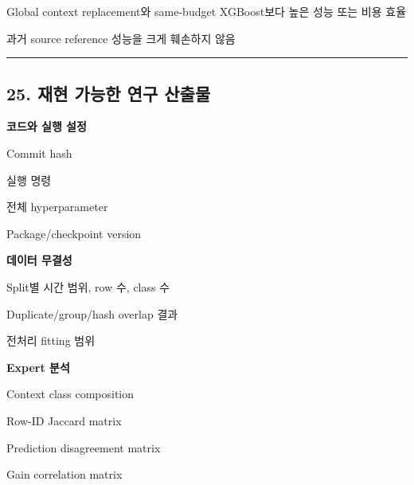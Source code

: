 \par\noindent \textbullet\enspace Global context replacement와 same-budget XGBoost보다 높은 성능 또는 비용 효율


\par\noindent \textbullet\enspace 과거 source reference 성능을 크게 훼손하지 않음



\medskip\hrule\medskip
\subsection{25. 재현 가능한 연구 산출물}
\par\noindent \textbullet\enspace \textbf{코드와 실행 설정}

\par\noindent \textbullet\enspace Commit hash


\par\noindent \textbullet\enspace 실행 명령


\par\noindent \textbullet\enspace 전체 hyperparameter


\par\noindent \textbullet\enspace Package/\allowbreak{}checkpoint version



\par\noindent \textbullet\enspace \textbf{데이터 무결성}

\par\noindent \textbullet\enspace Split별 시간 범위, row 수, class 수


\par\noindent \textbullet\enspace Duplicate/\allowbreak{}group/\allowbreak{}hash overlap 결과


\par\noindent \textbullet\enspace 전처리 fitting 범위



\par\noindent \textbullet\enspace \textbf{Expert 분석}

\par\noindent \textbullet\enspace Context class composition


\par\noindent \textbullet\enspace Row-ID Jaccard matrix


\par\noindent \textbullet\enspace Prediction disagreement matrix


\par\noindent \textbullet\enspace Gain correlation matrix


